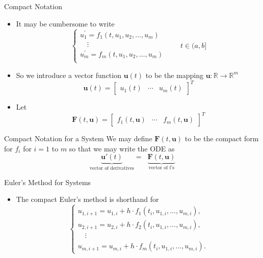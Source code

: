 \documentclass[10pt]{beamer}
\begin{document}
\begin{frame}{Compact Notation}
\begin{itemize}
    \item It may be cumbersome to write 
    $$
    \begin{cases}
    u_1^\prime = f_1(t,u_1, u_2, \ldots, u_m)\\
    \quad \vdots \\ 
    u_m^\prime = f_m(t,u_1, u_2, \ldots, u_m)\\
    \end{cases}\qquad t \in (a,b]
    $$
    \item So we introduce a vector function $\mathbf{u}(t)$ to be the mapping $\mathbf{u}:\mathbb{R}\rightarrow \mathbb{R}^{m}$
    $$
        \mathbf{u}(t) = 
        \begin{bmatrix} 
        u_{1}(t) & \cdots &  u_{m}(t) 
        \end{bmatrix}^T
    $$
    \item Let 
    $$
        \mathbf{F}(t,\textbf{u}) = 
        \begin{bmatrix} 
        f_1(t,\textbf{u}) & \cdots &  f_{m}(t,\textbf{u}) 
        \end{bmatrix}^T
    $$
\end{itemize}
    
    \begin{block}{Compact Notation for a System}
    We may define $\mathbf{F}(t,\textbf{u})$ to be the compact form for $f_i$ for $i = 1$ to $m$ so that we may write the ODE as
        $$\underbrace{\mathbf{u}'(t)}_{\text{vector of derivatives}} =\;\; \underbrace{\mathbf{F}(t,\mathbf{u})}_{\text{vector of f's}}$$
    \end{block}
\end{frame}
\begin{frame}{Euler's Method for Systems}
\begin{itemize}
    \begin{block}{Euler's Method}
        
    To solve the $m$ dimensional first-order IVP
    \[
    \mathbf{u}^\prime(t) = \mathbf{F}(t, \mathbf{u}), \quad \mathbf{u}(t_0) = \mathbf{u}_0,
    \]
    apply Euler's method component-wise:
    \[
    \mathbf{u}_{i+1} = \mathbf{u}_i + h \cdot \mathbf{F}(t_i, \mathbf{u}_i),
    \]
    where \(t_i = t_0 + i h\) and \(h\) is the step size.
    \end{block}

    \item The compact Euler's method is shorthand for
    \[
    \begin{cases}
    u_{1,i+1} = u_{1,i} + h \cdot f_1(t_i, u_{1,i}, \ldots, u_{m,i}), \\
    u_{2,i+1} = u_{2,i} + h \cdot f_2(t_i, u_{1,i}, \ldots, u_{m,i}), \\
    \quad \vdots \\
    u_{m,i+1} = u_{m,i} + h \cdot f_m(t_i, u_{1,i}, \ldots, u_{m,i}).
    \end{cases}
    \]

\end{itemize}
\end{frame}
\end{document}
